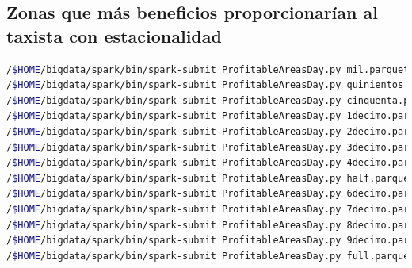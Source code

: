 \subsection{Zonas que más beneficios proporcionarían al taxista con estacionalidad}
\begin{lstlisting}[label=sprofday,language=sh,frame=single,caption=Script onas que más beneficios proporcionarían al taxista con estacionalidad en modo pseudo-distribuido]
/$HOME/bigdata/spark/bin/spark-submit ProfitableAreasDay.py mil.parquet martes 01-01 11:00
/$HOME/bigdata/spark/bin/spark-submit ProfitableAreasDay.py quinientos.parquet martes 01-01 11:00
/$HOME/bigdata/spark/bin/spark-submit ProfitableAreasDay.py cinquenta.parquet martes 01-01 11:00
/$HOME/bigdata/spark/bin/spark-submit ProfitableAreasDay.py 1decimo.parquet martes 01-01 11:00
/$HOME/bigdata/spark/bin/spark-submit ProfitableAreasDay.py 2decimo.parquet martes 01-01 11:00
/$HOME/bigdata/spark/bin/spark-submit ProfitableAreasDay.py 3decimo.parquet martes 01-01 11:00
/$HOME/bigdata/spark/bin/spark-submit ProfitableAreasDay.py 4decimo.parquet martes 01-01 11:00
/$HOME/bigdata/spark/bin/spark-submit ProfitableAreasDay.py half.parquet martes 01-01 11:00
/$HOME/bigdata/spark/bin/spark-submit ProfitableAreasDay.py 6decimo.parquet martes 01-01 11:00
/$HOME/bigdata/spark/bin/spark-submit ProfitableAreasDay.py 7decimo.parquet martes 01-01 11:00
/$HOME/bigdata/spark/bin/spark-submit ProfitableAreasDay.py 8decimo.parquet martes 01-01 11:00
/$HOME/bigdata/spark/bin/spark-submit ProfitableAreasDay.py 9decimo.parquet martes 01-01 11:00
/$HOME/bigdata/spark/bin/spark-submit ProfitableAreasDay.py full.parquet martes 01-01 11:00
\end{lstlisting}

